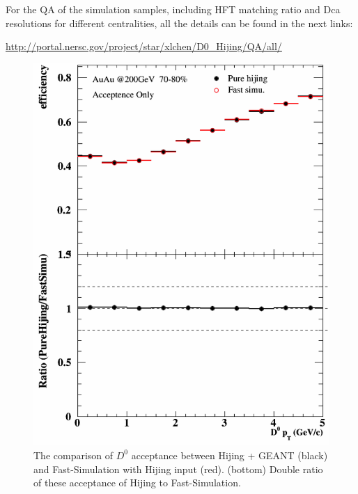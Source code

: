 For the QA of the simulation samples, including HFT matching ratio and Dca resolutions for different centralities, all the details can be found in the next links:

\url{http://portal.nersc.gov/project/star/xlchen/D0_Hijing/QA/all/}

\begin{figure}[htbp]
\begin{minipage}[htbp]{0.47\linewidth}
\centering
\includegraphics[width=1.0\textwidth,angle=0]{figure/Run14_D0HFT/70_80_0.png}
\caption{ The comparison of $D^0$ acceptance between Hijing + GEANT (black) and Fast-Simulation with Hijing input (red). (bottom) Double ratio of these acceptance of Hijing to Fast-Simulation.\label{70_80_0}}
\end{minipage}
\hfill
\begin{minipage}[htbp]{0.47\linewidth}
\centering

\end{minipage}
\end{figure}
